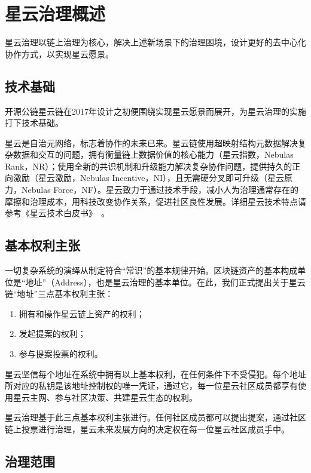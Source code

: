 \section{星云治理概述}

星云治理以链上治理为核心，解决上述新场景下的治理困境，设计更好的去中心化协作方式，以实现星云愿景。

\subsection{技术基础}

开源公链星云链在2017年设计之初便围绕实现星云愿景而展开，为星云治理的实施打下技术基础。

星云是自治元网络，标志着协作的未来已来。星云链使用超映射结构元数据解决复杂数据和交互的问题，拥有衡量链上数据价值的核心能力（星云指数，Nebulas Rank，NR）；使用全新的共识机制和升级能力解决复杂协作问题，提供持久的正向激励（星云激励，Nebulas Incentive，NI），且无需硬分叉即可升级（星云原力，Nebulas Force，NF）。星云致力于通过技术手段，减小人为治理通常存在的摩擦和治理成本，用科技改变协作关系，促进社区良性发展。详细星云技术特点请参考《星云技术白皮书》~\cite{TechWhitepaper}。

\subsection{基本权利主张}
\label{rights}

一切复杂系统的演绎从制定符合“常识”的基本规律开始。区块链资产的基本构成单位是“地址”（Address），也是星云治理的基本单位。在此，我们正式提出关于星云链“地址”三点基本权利主张：

\begin{enumerate}
	\item 拥有和操作星云链上资产的权利；
	\item 发起提案的权利；
	\item 参与提案投票的权利。
\end{enumerate}

星云坚信每个地址在系统中拥有以上基本权利，在任何条件下不受侵犯。每个地址所对应的私钥是该地址控制权的唯一凭证，通过它，每一位星云社区成员都享有使用星云主网、参与社区决策、共建星云生态的权利。

星云治理基于此三点基本权利主张进行。任何社区成员都可以提出提案，通过社区链上投票进行治理，星云未来发展方向的决定权在每一位星云社区成员手中。

\subsection{治理范围}

